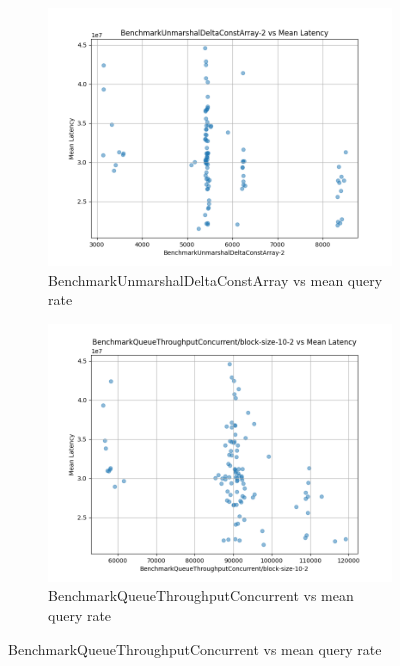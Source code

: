 \begin{figure}[ht]
    \captionsetup[subfigure]{list=true}
    \centering
    \begin{subfigure}[b]{0.49\textwidth}
        \centering
        \includegraphics[width=\textwidth]{figures/BenchmarkUnmarshalDeltaConstArray-2_vs_mean_latency.png}
        \caption{BenchmarkUnmarshalDeltaConstArray vs mean query rate}
        \label{fig:BenchmarkUnmarshalDeltaConstArray-2_vs}
    \end{subfigure}
    \hfill
    \begin{subfigure}[b]{0.49\textwidth}
        \centering
        \includegraphics[width=\textwidth]{figures/BenchmarkQueueThroughputConcurrent_block-size-10-2_vs_mean_latency.png}
        \caption{BenchmarkQueueThroughputConcurrent vs mean query rate}
        \label{fig:BenchmarkQueueThroughputConcurrent_vs_mean_latency}
    \end{subfigure}


\end{figure}
